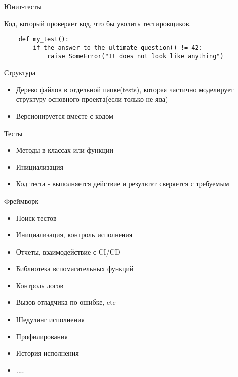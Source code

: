 \documentclass{article}
\begin{document}
\LARGE

\begin{center}Юнит-тесты\end{center}
    Код, который проверяет код, что бы уволить тестировщиков.
\begin{verbatim}
    def my_test():
    	if the_answer_to_the_ultimate_question() != 42:
            raise SomeError("It does not look like anything")
\end{verbatim}
\newpage

\begin{center}Структура\end{center}
\begin{itemize}
    \item Дерево файлов в отдельной папке(tests), которая частично моделирует
          структуру основного проекта(если только не ява)
    \item Версионируется вместе с кодом
\end{itemize}
\newpage

\begin{center}Тесты\end{center}
\begin{itemize}
    \item Методы в классах или функции
    \item Инициализация
	\item Код теста - выполняется действие и результат сверяется с требуемым
\end{itemize}
\newpage

\begin{center}Фреймворк\end{center}
\begin{itemize}
    \item Поиск тестов
    \item Инициализация, контроль исполнения
	\item Отчеты, взаимодействие с CI/CD
    \item Библиотека вспомагательных функций
    \item Контроль логов
    \item Вызов отладчика по ошибке, etc
    \item Шедулинг исполнения
    \item Профилирования
    \item История исполнения
    \item ....
\end{itemize}
\newpage
\end{document}
